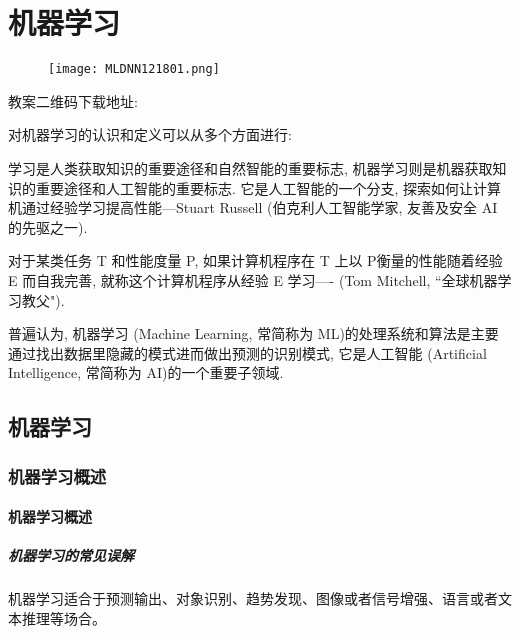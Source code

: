 \chapter{机器学习}\label{AI32PChapter7}
\begin{figure}[H]
\centering
\texttt{[image: MLDNN121801.png]}
\label{MLDNN12019121501}
\end{figure}
教案二维码下载地址: 

对机器学习的认识和定义可以从多个方面进行:
\begin{tcolorbox}[colback=white!50,colframe=orange!50,title=机器学习]
学习是人类获取知识的重要途径和自然智能的重要标志, 机器学习则是机器获取知识的重要途径和人工智能的重要标志.
它是人工智能的一个分支, 探索如何让计算机通过经验学习提高性能---Stuart Russell (伯克利人工智能学家, 友善及安全 AI 的先驱之一).
\end{tcolorbox}
\begin{tcolorbox}[colback=white!50,colframe=orange!50,title=机器学习]
对于某类任务 T 和性能度量 P, 如果计算机程序在 T 上以 P衡量的性能随着经验 E 而自我完善, 就称这个计算机程序从经验 E 学习---- (Tom Mitchell, “全球机器学习教父").
\hfill
\end{tcolorbox}
普遍认为, 机器学习 (Machine Learning, 常简称为 ML)的处理系统和算法是主要通过找出数据里隐藏的模式进而做出预测的识别模式, 它是人工智能 (Artificial Intelligence, 常简称为 AI)的一个重要子领域.
\section{机器学习}
\subsection{机器学习概述}
\subsubsection{机器学习概述}
\paragraph{机器学习的常见误解}
机器学习适合于预测输出、对象识别、趋势发现、图像或者信号增强、语言或者文本推理等场合。

